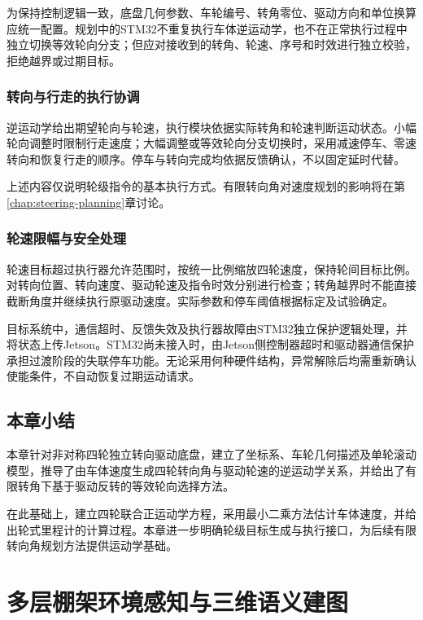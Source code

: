 \documentclass[UTF8,12pt,a4paper,openany]{ctexbook}
\begin{document}
为保持控制逻辑一致，底盘几何参数、车轮编号、转角零位、驱动方向和单位换算应统一配置。规划中的STM32不重复执行车体逆运动学，也不在正常执行过程中独立切换等效轮向分支；但应对接收到的转角、轮速、序号和时效进行独立校验，拒绝越界或过期目标。

\subsection{转向与行走的执行协调}

逆运动学给出期望轮向与轮速，执行模块依据实际转角和轮速判断运动状态。小幅轮向调整时限制行走速度；大幅调整或等效轮向分支切换时，采用减速停车、零速转向和恢复行走的顺序。停车与转向完成均依据反馈确认，不以固定延时代替。

上述内容仅说明轮级指令的基本执行方式。有限转向角对速度规划的影响将在第\ref{chap:steering-planning}章讨论。

\subsection{轮速限幅与安全处理}

轮速目标超过执行器允许范围时，按统一比例缩放四轮速度，保持轮间目标比例。对转向位置、转向速度、驱动轮速及指令时效分别进行检查；转角越界时不能直接截断角度并继续执行原驱动速度。实际参数和停车阈值根据标定及试验确定。

目标系统中，通信超时、反馈失效及执行器故障由STM32独立保护逻辑处理，并将状态上传Jetson。STM32尚未接入时，由Jetson侧控制器超时和驱动器通信保护承担过渡阶段的失联停车功能。无论采用何种硬件结构，异常解除后均需重新确认使能条件，不自动恢复过期运动请求。

\section{本章小结}

本章针对非对称四轮独立转向驱动底盘，建立了坐标系、车轮几何描述及单轮滚动模型，推导了由车体速度生成四轮转向角与驱动轮速的逆运动学关系，并给出了有限转角下基于驱动反转的等效轮向选择方法。

在此基础上，建立四轮联合正运动学方程，采用最小二乘方法估计车体速度，并给出轮式里程计的计算过程。本章进一步明确轮级目标生成与执行接口，为后续有限转向角规划方法提供运动学基础。


\chapter{多层棚架环境感知与三维语义建图}
\label{chap:perception-mapping}
\end{document}
